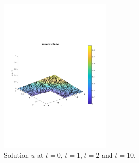 \documentclass[11pt, a4paper]{article}
\begin{document}
\begin{figure}
  \includegraphics[width=0.49\textwidth]{assets/sol_t10_3030.pdf}
  \caption{Solution $u$ at $t=0$, $t=1$, $t=2$ and $t=10$.}\label{fig:sol90}
\end{figure}
\end{document}
